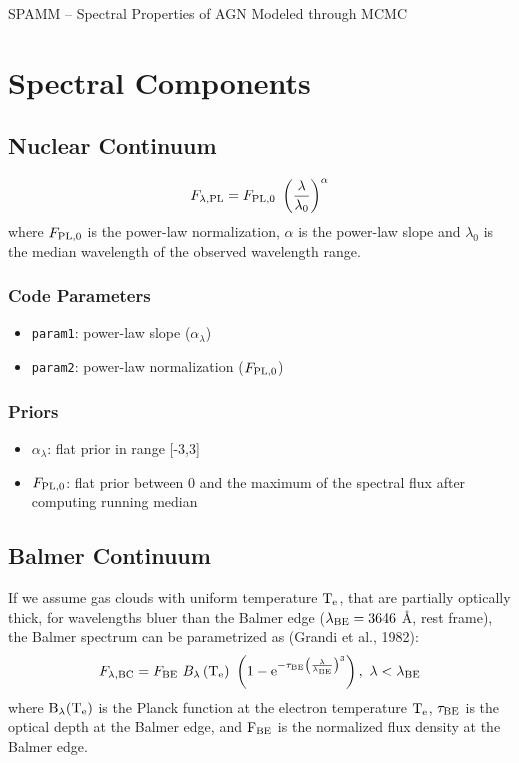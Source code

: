 \documentclass[12pt,letterpaper]{article}
\begin{document}
\begin{center}
{\large SPAMM -- Spectral Properties of AGN Modeled through MCMC }
\end{center}
\vspace{0.05in}

\section*{Spectral Components}

\subsection*{Nuclear Continuum}
\begin{equation}
F_{\lambda,{\rm PL}}=F_{\rm PL,0} \ \left(\frac{\lambda}{\lambda_0}\right)^{\alpha} 
\end{equation}
where $F_{\rm PL,0}$ is the power-law normalization, $\alpha$ is the power-law slope and $\lambda_0$ is the median wavelength 
of the observed wavelength range. 

\subsubsection*{Code Parameters}
\begin{itemize}
    \item {\tt param1}: power-law slope ($\alpha_{\lambda}$)
    \item {\tt param2}: power-law normalization ($F_{\rm PL,0}$)
\end{itemize}

\subsubsection*{Priors}
\begin{itemize}
    \item {\tt $\alpha_{\lambda}$}: flat prior in range [-3,3]
    \item {\tt $F_{\rm PL,0}$}: flat prior between 0 and the maximum of the spectral flux after computing running median
\end{itemize}


\subsection*{Balmer Continuum}
If we assume gas clouds with uniform temperature $\rm{T}_{\rm{e}}$, that are partially optically thick, for wavelengths bluer 
than the Balmer edge ($\lambda_{\rm{BE}}=3646$ \AA, rest frame), the Balmer spectrum can be parametrized as 
(Grandi et al., 1982): 
\begin{equation}
F_{\lambda,{\rm BC}}= F_{{\rm BE}} \ B_{\lambda}\left({\rm T}_{{\rm e}}\right) \ \left(1-{\rm e}^{-\tau_{{\rm BE}}\left(\frac{\lambda}{\lambda_{{\rm BE}}}\right)^3}\right), \ \lambda<\lambda_{\rm{BE}}
\end{equation}
where $\rm{B}_{\lambda}(\rm{T}_{\rm{e}})$ is the Planck function at the electron temperature $\rm{T}_{\rm{e}}$, $\tau_{\rm{BE}}$ is the optical 
depth at the Balmer edge, and $\rm{F}_{\rm{BE}}$ is the normalized flux density at the Balmer edge. 
\end{document}
